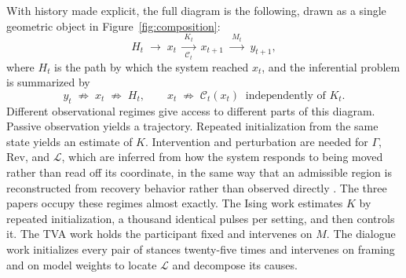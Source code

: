 \documentclass[11pt]{article}
\theoremstyle{definition}
\theoremstyle{remark}
\begin{document}
With history made explicit, the full diagram is the following, drawn as a single geometric object in Figure~\ref{fig:composition}:
\begin{equation}
H_t \;\longrightarrow\; x_t \;\xrightarrow[\;\mathcal{C}_t\;]{K_t}\; x_{t+1} \;\xrightarrow{\;M_t\;}\; y_{t+1},
\end{equation}
where $H_t$ is the path by which the system reached $x_t$, and the inferential problem is summarized by
\begin{equation}
y_t \;\not\Rightarrow\; x_t \;\not\Rightarrow\; H_t, \qquad x_t \;\not\Rightarrow\; \mathcal{C}_t(x_t) \ \text{ independently of } K_t .
\end{equation}
Different observational regimes give access to different parts of this diagram. Passive observation yields a trajectory. Repeated initialization from the same state yields an estimate of $K$. Intervention and perturbation are needed for $\Gamma$, $\mathrm{Rev}$, and $\mathcal{L}$, which are inferred from how the system responds to being moved rather than read off its coordinate, in the same way that an admissible region is reconstructed from recovery behavior rather than observed directly \cite{flyxion-clipboard}. The three papers occupy these regimes almost exactly. The Ising work estimates $K$ by repeated initialization, a thousand identical pulses per setting, and then controls it. The TVA work holds the participant fixed and intervenes on $M$. The dialogue work initializes every pair of stances twenty-five times and intervenes on framing and on model weights to locate $\mathcal{L}$ and decompose its causes.
\end{document}
